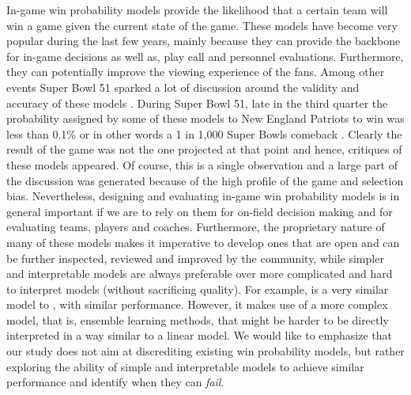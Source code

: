 \documentclass{sig-alternate}
\begin{document}
In-game win probability models provide the likelihood that a certain team will win a game given the current state of the game.  
These models have become very popular during the last few years, mainly because they can provide the backbone for in-game decisions as well as, play call and personnel evaluations. 
Furthermore, they can potentially improve the viewing experience of the fans.  
Among other events Super Bowl 51 sparked a lot of discussion around the validity and accuracy of these models \cite{ringer17}. 
During Super Bowl 51, late in the third quarter the probability assigned by some of these models to New England Patriots to win was less than 0.1\% or in other words a 1 in 1,000 Super Bowls comeback \cite{statsbylopez}.  
Clearly the result of the game was not the one projected at that point and hence, critiques of these models appeared.  
Of course, this is a single observation and a large part of the discussion was generated because of the high profile of the game and selection bias. 
Nevertheless, designing and evaluating in-game win probability models is in general important if we are to rely on them for on-field decision making and for evaluating teams, players and coaches. 
Furthermore, the proprietary nature of many of these models makes it imperative to develop ones that are open and can be further inspected, reviewed and improved by the community, while simpler and interpretable models are always preferable over more complicated and hard to interpret models (without sacrificing quality). 
For example, \cite{lock2014using} is a very similar model to {\method}, with similar performance. 
However, it makes use of a more complex model, that is, ensemble learning methods, that might be harder to be directly interpreted in a way similar to a linear model.  
We would like to emphasize that our study does not aim at discrediting existing win probability models, but rather exploring the ability of simple and interpretable models to achieve similar performance and identify when they can {\em fail}. 
\end{document}
